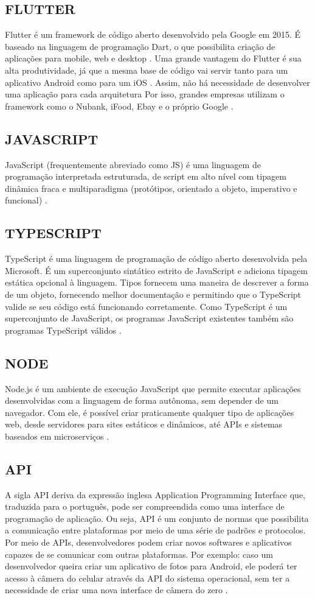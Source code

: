 \documentclass[a4paper,12pt]{article}
\begin{document}
\subsection{FLUTTER}
Flutter é um framework de código aberto desenvolvido pela Google em 2015. É baseado
na linguagem de programação Dart, o que possibilita criação de aplicações para mobile, web e
desktop \cite{flutter}.
Uma grande vantagem do Flutter é sua alta produtividade, já que a mesma base de código
vai servir tanto para um aplicativo Android como para um iOS \cite{geekhunter}. Assim, não há necessidade de desenvolver uma aplicação para cada arquitetura Por isso,
grandes empresas utilizam o framework como o Nubank, iFood, Ebay e o próprio Google \cite{geekhunter}.
\subsection{JAVASCRIPT}
JavaScript (frequentemente abreviado como JS) é uma linguagem de programação
interpretada estruturada, de script em alto nível com tipagem dinâmica fraca e
multiparadigma (protótipos, orientado a objeto,
imperativo e funcional) \cite{javascript}.
\subsection{TYPESCRIPT}
TypeScript é uma linguagem de programação de código aberto desenvolvida pela
Microsoft. É um superconjunto sintático estrito de JavaScript e adiciona tipagem
estática opcional à linguagem. Tipos fornecem uma maneira de descrever a forma de
um objeto, fornecendo melhor documentação e permitindo que o TypeScript valide
se seu código está funcionando corretamente.
Como TypeScript é um superconjunto de JavaScript, os programas JavaScript existentes também são programas TypeScript válidos \cite{typescript}.
\subsection{NODE}
Node.js é um ambiente de execução JavaScript que permite executar aplicações desenvolvidas com a linguagem de
forma autônoma, sem depender de um navegador. Com ele, é possível criar
praticamente qualquer tipo de aplicações web, desde servidores para
sites estáticos e dinâmicos, até APIs e sistemas baseados em microserviços \cite{node}.
\subsection{API}
A sigla \ac{API} deriva da expressão inglesa Application Programming Interface que, traduzida para o português, pode ser compreendida como uma interface de programação de aplicação. Ou seja, \ac{API} é um conjunto de normas que possibilita a comunicação entre plataformas por meio de uma série de padrões e protocolos.
Por meio de APIs, desenvolvedores podem criar novos softwares e aplicativos capazes de se comunicar com outras plataformas. Por exemplo: caso um desenvolvedor queira criar um aplicativo de fotos para Android, ele poderá ter acesso à câmera do celular através da \ac{API} do sistema operacional, sem ter a necessidade de criar uma nova interface de câmera do zero \cite{api}.
\end{document}
